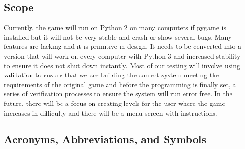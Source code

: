 \documentclass[12pt, titlepage]{article}
\begin{document}
\subsection{Scope}
Currently, the game will run on Python 2 on many computers if pygame is installed but it will not be very stable and crash or show several bugs. Many features are lacking and it is primitive in design. It needs to be converted into a version that will work on every computer with Python 3 and increased stability to ensure it does not shut down instantly. Most of our testing will involve using validation to ensure that we are building the correct system meeting the requirements of the original game and before the programming is finally set, a series of verification processes to ensure the system will run error free.  In the future, there will be a focus on creating levels for the user where the game increases in difficulty and there will be a menu screen with instructions.

\subsection{Acronyms, Abbreviations, and Symbols}
    
\end{document}
